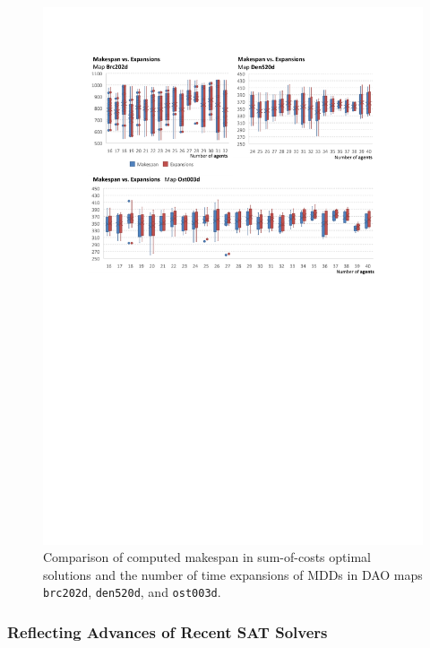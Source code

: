 \documentclass[jair,oneside,11pt]{article}
\begin{document}
\begin{figure}[h]
\centering
\includegraphics[trim={2.5cm 14cm 2.5cm 2.7cm},clip,width=1.0\textwidth]{expr_maps-make-expand_100.pdf}
\vspace{-0.6cm}\caption{Comparison of computed makespan in sum-of-costs optimal solutions and the number of time expansions of MDDs in DAO maps \texttt{brc202d}, \texttt{den520d}, and \texttt{ost003d}.}
\label{figure-make-expand-maps_100}
\end{figure}

\subsubsection{Reflecting Advances of Recent SAT Solvers}
\end{document}
